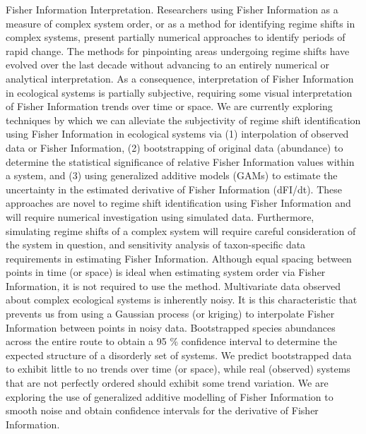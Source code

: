 \documentclass[12pt,twoside,openany]{reedthesis}
\begin{document}
Fisher Information Interpretation. Researchers using Fisher Information as a measure of complex system order, or as a method for identifying regime shifts in complex systems, present partially numerical approaches to identify periods of rapid change. The methods for pinpointing areas undergoing regime shifts have evolved over the last decade without advancing to an entirely numerical or analytical interpretation. As a consequence, interpretation of Fisher Information in ecological systems is partially subjective, requiring some visual interpretation of Fisher Information trends over time or space.
We are currently exploring techniques by which we can alleviate the subjectivity of regime shift identification using Fisher Information in ecological systems via (1) interpolation of observed data or Fisher Information, (2) bootstrapping of original data (abundance) to determine the statistical significance of relative Fisher Information values within a system, and (3) using generalized additive models (GAMs) to estimate the uncertainty in the estimated derivative of Fisher Information (dFI/dt). These approaches are novel to regime shift identification using Fisher Information and will require numerical investigation using simulated data. Furthermore, simulating regime shifts of a complex system will require careful consideration of the system in question, and sensitivity analysis of taxon-specific data requirements in estimating Fisher Information.
Although equal spacing between points in time (or space) is ideal when estimating system order via Fisher Information, it is not required to use the method. Multivariate data observed about complex ecological systems is inherently noisy. It is this characteristic that prevents us from using a Gaussian process (or kriging) to interpolate Fisher Information between points in noisy data. Bootstrapped species abundances across the entire route to obtain a 95 \% confidence interval to determine the expected structure of a disorderly set of systems. We predict bootstrapped data to exhibit little to no trends over time (or space), while real (observed) systems that are not perfectly ordered should exhibit some trend variation. We are exploring the use of generalized additive modelling of Fisher Information to smooth noise and obtain confidence intervals for the derivative of Fisher Information.
\end{document}

